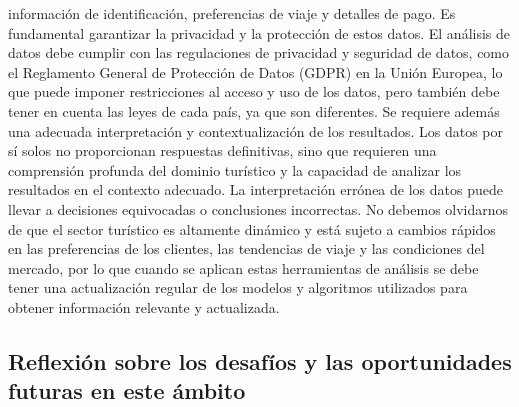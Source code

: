 \documentclass[
  letterpaper,
  DIV=11,
  numbers=noendperiod]{scrreprt}
\begin{document}
información de identificación, preferencias de viaje y detalles de pago.
Es fundamental garantizar la privacidad y la protección de estos datos.
El análisis de datos debe cumplir con las regulaciones de privacidad y
seguridad de datos, como el Reglamento General de Protección de Datos
(GDPR) en la Unión Europea, lo que puede imponer restricciones al acceso
y uso de los datos, pero también debe tener en cuenta las leyes de cada
país, ya que son diferentes. Se requiere además una adecuada
interpretación y contextualización de los resultados. Los datos por sí
solos no proporcionan respuestas definitivas, sino que requieren una
comprensión profunda del dominio turístico y la capacidad de analizar
los resultados en el contexto adecuado. La interpretación errónea de los
datos puede llevar a decisiones equivocadas o conclusiones incorrectas.
No debemos olvidarnos de que el sector turístico es altamente dinámico y
está sujeto a cambios rápidos en las preferencias de los clientes, las
tendencias de viaje y las condiciones del mercado, por lo que cuando se
aplican estas herramientas de análisis se debe tener una actualización
regular de los modelos y algoritmos utilizados para obtener información
relevante y actualizada.

\hypertarget{reflexiuxf3n-sobre-los-desafuxedos-y-las-oportunidades-futuras-en-este-uxe1mbito}{%
\subsection{Reflexión sobre los desafíos y las oportunidades futuras en
este
ámbito}\label{reflexiuxf3n-sobre-los-desafuxedos-y-las-oportunidades-futuras-en-este-uxe1mbito}}
\end{document}
